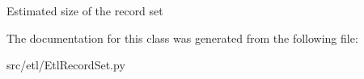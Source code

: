 \begin{DoxyVerb}Estimated size of the record set\end{DoxyVerb}
 

The documentation for this class was generated from the following file\-:\begin{DoxyCompactItemize}
\item 
src/etl/Etl\-Record\-Set.\-py\end{DoxyCompactItemize}
